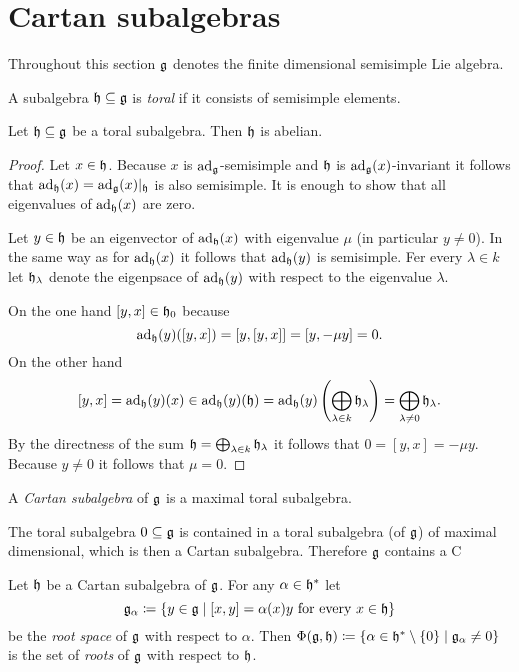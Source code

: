 \section{Cartan subalgebras}
Throughout this section $\mathfrak{g}$ denotes the finite dimensional semisimple Lie algebra.


\begin{defi}
 A subalgebra $\mathfrak{h} \subseteq \mathfrak{g}$ is \emph{toral} if it consists of semisimple elements.
\end{defi}


\begin{lem}
 Let $\mathfrak{h} \subseteq \mathfrak{g}$ be a toral subalgebra. Then $\mathfrak{h}$ is abelian.
\end{lem}
\begin{proof}
 Let $x \in \mathfrak{h}$. Because $x$ is $\operatorname{ad}_{\mathfrak{g}}$-semisimple and $\mathfrak{h}$ is $\operatorname{ad}_{\mathfrak{g}}(x)$-invariant it follows that $\operatorname{ad}_{\mathfrak{h}}(x) = \operatorname{ad}_{\mathfrak{g}}(x)|_{\mathfrak{h}}$ is also semisimple. It is enough to show that all eigenvalues of $\operatorname{ad}_{\mathfrak{h}}(x)$ are zero.
 
 Let $y \in \mathfrak{h}$ be an eigenvector of $\operatorname{ad}_{\mathfrak{h}}(x)$ with eigenvalue $\mu$ (in particular $y \neq 0$). In the same way as for $\operatorname{ad}_{\mathfrak{h}}(x)$ it follows that $\operatorname{ad}_{\mathfrak{h}}(y)$ is semisimple. Fer every $\lambda \in k$ let $\mathfrak{h}_\lambda$ denote the eigenpsace of $\operatorname{ad}_{\mathfrak{h}}(y)$ with respect to the eigenvalue $\lambda$.
 
  On the one hand $[y,x] \in \mathfrak{h}_0$ because
 \[
  \operatorname{ad}_{\mathfrak{h}}(y)([y,x])
  = [y,[y,x]]
  = [y, -\mu y]
  = 0.
 \]
 On the other hand
 \[
  [y,x]
  = \operatorname{ad}_{\mathfrak{h}}(y)(x)
  \in \operatorname{ad}_{\mathfrak{h}}(y)(\mathfrak{h})
  = \operatorname{ad}_{\mathfrak{h}}(y)\left( \bigoplus_{\lambda \in k} \mathfrak{h}_\lambda \right)
  = \bigoplus_{\lambda \neq 0} \mathfrak{h}_\lambda.
 \]
 By the directness of the sum $\mathfrak{h} = \bigoplus_{\lambda \in k} \mathfrak{h}_\lambda$ it follows that $0 = [y,x] = -\mu y$. Because $y \neq 0$ it follows that $\mu = 0$.
\end{proof}


\begin{defi}
 A \emph{Cartan subalgebra} of $\mathfrak{g}$ is a maximal toral subalgebra.
\end{defi}


\begin{expl}
 The toral subalgebra $0 \subseteq \mathfrak{g}$ is contained in a toral subalgebra (of $\mathfrak{g}$) of maximal dimensional, which is then a Cartan subalgebra. Therefore $\mathfrak{g}$ contains a C
\end{expl}



\begin{defi}
 Let $\mathfrak{h}$ be a Cartan subalgebra of $\mathfrak{g}$. For any $\alpha \in \mathfrak{h}^*$ let
 \[
  \mathfrak{g}_\alpha \coloneqq \{y \in \mathfrak{g} \mid \text{$[x,y] = \alpha(x)y$ for every $x \in \mathfrak{h}$}\}
 \]
 be the \emph{root space} of $\mathfrak{g}$ with respect to $\alpha$. Then $\Phi(\mathfrak{g}, \mathfrak{h}) \coloneqq \{\alpha \in \mathfrak{h}^* \setminus \{0\} \mid \mathfrak{g}_\alpha \neq 0\}$ is the set of \emph{roots} of $\mathfrak{g}$ with respect to $\mathfrak{h}$.
\end{defi}


